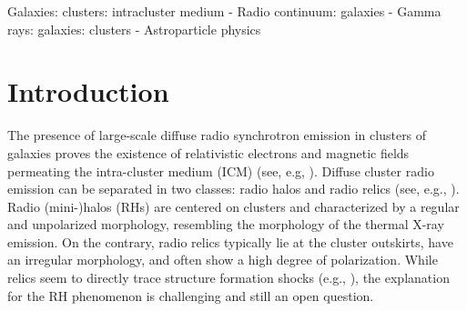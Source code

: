 \documentclass[useAMS,usenatbib]{mn2e}
\begin{document}
\begin{keywords}
  Galaxies: clusters: intracluster medium - Radio continuum: galaxies - Gamma
  rays: galaxies: clusters - Astroparticle physics
\end{keywords}



\section{Introduction}
\label{sec:1}

\begingroup
\let\thefootnote\relax{}
\let\thefootnote\relax{}
\let\thefootnote\relax{}
\endgroup

The presence of large-scale diffuse radio synchrotron emission in clusters of
galaxies proves the existence of relativistic electrons and magnetic fields
permeating the intra-cluster medium (ICM) (see,
e.g, \citealp{2004NewAR..48.1137F}).  Diffuse cluster radio emission can be
separated in two classes: radio halos and radio relics (see,
e.g., \citealp{2004rcfg.procE..25K,2008SSRv..134...93F}).  Radio
\mbox{(mini-)}halos (RHs) are centered on clusters and characterized by a
regular and unpolarized morphology, resembling the morphology of the thermal
X-ray emission. On the contrary, radio relics typically lie at the cluster
outskirts, have an irregular morphology, and often show a high degree of
polarization. While relics seem to directly trace structure formation shocks
(e.g., \citealp{2011A&A...533A..35V}), the explanation for the RH phenomenon
is challenging and still an open question.
                                   
\end{document}
